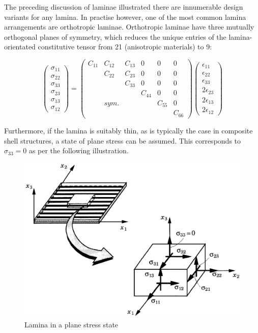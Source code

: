 The preceding discussion of laminae illustrated there are innumerable design variants for any lamina. In practise however, one of the most common lamina arrangements are orthotropic laminae. Orthotropic laminae have three mutually orthogonal planes of symmetry, which reduces the unique entries of the lamina-orientated constitutive tensor from 21 (anisotropic materials) to 9:

\begin{equation} 
\begin{pmatrix}
\sigma_{11} \\
\sigma_{22} \\
\sigma_{33} \\
\sigma_{23} \\
\sigma_{13} \\
\sigma_{12}
\end{pmatrix}
=
\begin{pmatrix}
C_{11} & C_{12} & C_{13} & 0 & 0 & 0 \\
\  & C_{22} & C_{23} & 0 & 0 & 0 \\
\  & \  & C_{33} & 0 & 0 & 0 \\
\  & \  & \  & C_{44} & 0 & 0 \\
\  & sym. & \  & \ & C_{55} & 0 \\
\  & \  & \  & \  & \  & C_{66}
\end{pmatrix}
\begin{pmatrix}
\epsilon_{11} \\
\epsilon_{22} \\
\epsilon_{33} \\
2\epsilon_{23} \\
2\epsilon_{13} \\
2\epsilon_{12}
\end{pmatrix}
\label{eqscomp3}
\end{equation}

Furthermore, if the lamina is suitably thin, as is typically the case in composite shell structures, a state of plane stress can be assumed. This corresponds to $\sigma_{33} = 0$ as per the following illustration.

\begin{figure}[h!]
	\centering
	\includegraphics[width=12cm]{images/composite_lamina_plane_stress}
	\caption{Lamina in a plane stress state \cite{reddy2004mechanics}}
	\label{fig:compositelaminaplanestress}
\end{figure}


